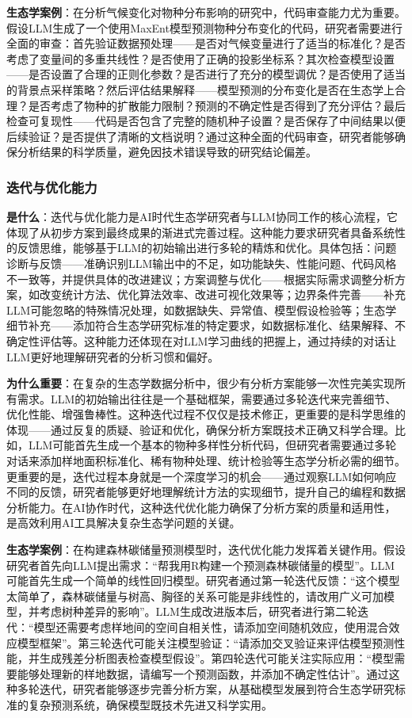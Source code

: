 \documentclass[
  twoside]{book}
\begin{document}
\textbf{生态学案例}：在分析气候变化对物种分布影响的研究中，代码审查能力尤为重要。假设LLM生成了一个使用MaxEnt模型预测物种分布变化的代码，研究者需要进行全面的审查：首先验证数据预处理------是否对气候变量进行了适当的标准化？是否考虑了变量间的多重共线性？是否使用了正确的投影坐标系？其次检查模型设置------是否设置了合理的正则化参数？是否进行了充分的模型调优？是否使用了适当的背景点采样策略？然后评估结果解释------模型预测的分布变化是否在生态学上合理？是否考虑了物种的扩散能力限制？预测的不确定性是否得到了充分评估？最后检查可复现性------代码是否包含了完整的随机种子设置？是否保存了中间结果以便后续验证？是否提供了清晰的文档说明？通过这种全面的代码审查，研究者能够确保分析结果的科学质量，避免因技术错误导致的研究结论偏差。

\hypertarget{ux8fedux4ee3ux4e0eux4f18ux5316ux80fdux529b}{%
\subsubsection{迭代与优化能力}\label{ux8fedux4ee3ux4e0eux4f18ux5316ux80fdux529b}}

\textbf{是什么}：迭代与优化能力是AI时代生态学研究者与LLM协同工作的核心流程，它体现了从初步方案到最终成果的渐进式完善过程。这种能力要求研究者具备系统性的反馈思维，能够基于LLM的初始输出进行多轮的精炼和优化。具体包括：问题诊断与反馈------准确识别LLM输出中的不足，如功能缺失、性能问题、代码风格不一致等，并提供具体的改进建议；方案调整与优化------根据实际需求调整分析方案，如改变统计方法、优化算法效率、改进可视化效果等；边界条件完善------补充LLM可能忽略的特殊情况处理，如数据缺失、异常值、模型假设检验等；生态学细节补充------添加符合生态学研究标准的特定要求，如数据标准化、结果解释、不确定性评估等。这种能力还体现在对LLM学习曲线的把握上，通过持续的对话让LLM更好地理解研究者的分析习惯和偏好。

\textbf{为什么重要}：在复杂的生态学数据分析中，很少有分析方案能够一次性完美实现所有需求。LLM的初始输出往往是一个基础框架，需要通过多轮迭代来完善细节、优化性能、增强鲁棒性。这种迭代过程不仅仅是技术修正，更重要的是科学思维的体现------通过反复的质疑、验证和优化，确保分析方案既技术正确又科学合理。比如，LLM可能首先生成一个基本的物种多样性分析代码，但研究者需要通过多轮对话来添加样地面积标准化、稀有物种处理、统计检验等生态学分析必需的细节。更重要的是，迭代过程本身就是一个深度学习的机会------通过观察LLM如何响应不同的反馈，研究者能够更好地理解统计方法的实现细节，提升自己的编程和数据分析能力。在AI协作时代，这种迭代优化能力确保了分析方案的质量和适用性，是高效利用AI工具解决复杂生态学问题的关键。

\textbf{生态学案例}：在构建森林碳储量预测模型时，迭代优化能力发挥着关键作用。假设研究者首先向LLM提出需求：``帮我用R构建一个预测森林碳储量的模型''。LLM可能首先生成一个简单的线性回归模型。研究者通过第一轮迭代反馈：``这个模型太简单了，森林碳储量与树高、胸径的关系可能是非线性的，请改用广义可加模型，并考虑树种差异的影响''。LLM生成改进版本后，研究者进行第二轮迭代：``模型还需要考虑样地间的空间自相关性，请添加空间随机效应，使用混合效应模型框架''。第三轮迭代可能关注模型验证：``请添加交叉验证来评估模型预测性能，并生成残差分析图表检查模型假设''。第四轮迭代可能关注实际应用：``模型需要能够处理新的样地数据，请编写一个预测函数，并添加不确定性估计''。通过这种多轮迭代，研究者能够逐步完善分析方案，从基础模型发展到符合生态学研究标准的复杂预测系统，确保模型既技术先进又科学实用。
\end{document}
